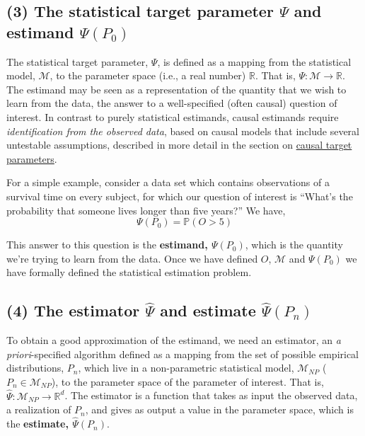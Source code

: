 \documentclass[12pt, krantz2,]{krantz}
\theoremstyle{definition}
\theoremstyle{definition}
\theoremstyle{definition}
\renewcommand{\P}{\mathbb{P}}
\newcommand{\R}{\mathbb{R}}
\newcommand{\M}{\mathcal{M}}
\newcommand{\1}{\mathbbm{1}}
\begin{document}
\hypertarget{the-statistical-target-parameter-psi-and-estimand-psip_0}{%
\subsection*{\texorpdfstring{(3) The statistical target parameter \(\Psi\) and estimand \(\Psi(P_0)\)}{(3) The statistical target parameter \textbackslash{}Psi and estimand \textbackslash{}Psi(P\_0)}}\label{the-statistical-target-parameter-psi-and-estimand-psip_0}}


The statistical target parameter, \(\Psi\), is defined as a mapping from the
statistical model, \(\M\), to the parameter space (i.e., a real number) \(\R\). That
is, \(\Psi: \M \rightarrow \R\). The estimand may be seen as a representation of
the quantity that we wish to learn from the data, the answer to a well-specified
(often causal) question of interest. In contrast to purely statistical
estimands, causal estimands require \emph{identification from the observed data},
based on causal models that include several untestable assumptions, described in
more detail in the section on \protect\hyperlink{causal}{causal target parameters}.

For a simple example, consider a data set which contains observations of a
survival time on every subject, for which our question of interest is ``What's
the probability that someone lives longer than five years?'' We have,
\begin{equation*}
  \Psi(P_0) = \P(O > 5)
\end{equation*}

This answer to this question is the \textbf{estimand, \(\Psi(P_0)\)}, which is the
quantity we're trying to learn from the data. Once we have defined \(O\), \(\M\) and
\(\Psi(P_0)\) we have formally defined the statistical estimation problem.

\hypertarget{the-estimator-hatpsi-and-estimate-hatpsip_n}{%
\subsection*{\texorpdfstring{(4) The estimator \(\hat{\Psi}\) and estimate \(\hat{\Psi}(P_n)\)}{(4) The estimator \textbackslash{}hat\{\textbackslash{}Psi\} and estimate \textbackslash{}hat\{\textbackslash{}Psi\}(P\_n)}}\label{the-estimator-hatpsi-and-estimate-hatpsip_n}}


To obtain a good approximation of the estimand, we need an estimator, an \emph{a
priori}-specified algorithm defined as a mapping from the set of possible
empirical distributions, \(P_n\), which live in a non-parametric statistical
model, \(\M_{NP}\) (\(P_n \in \M_{NP}\)), to the parameter space of the parameter of
interest. That is, \(\hat{\Psi} : \M_{NP} \rightarrow \R^d\). The estimator is a
function that takes as input the observed data, a realization of \(P_n\), and
gives as output a value in the parameter space, which is the \textbf{estimate,
\(\hat{\Psi}(P_n)\)}.
\end{document}
